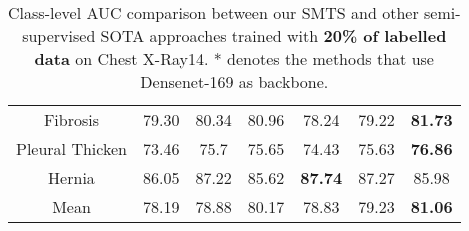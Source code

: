 \documentclass[runningheads]{llncs}
\begin{document}
\begin{table}[t!]
{\begin{tabular}{@{}c|c|c|c|c|c|c@{}}
Fibrosis        &      79.30                              & 80.34            &     80.96           & 78.24       & 79.22           &        \textbf{ 81.73 }   \\
Pleural Thicken &       73.46                             & 75.7             &      75.65          & 74.43       & 75.63           &       \textbf{  76.86 }   \\
Hernia          &      86.05                             & 87.22            &       85.62         & \textbf{87.74 }      & 87.27           &        85.98     \\ \hline 
Mean            &     78.19                               & 78.88            &       80.17         & 78.83       & 79.23           &        \textbf{81.06}     \\ \hline \bottomrule
\end{tabular}}
\caption{Class-level AUC comparison between our SMTS and other semi-supervised SOTA approaches trained with \textbf{20\% of labelled data} on Chest X-Ray14. * denotes the methods that use Densenet-169 as backbone.} \vspace{-.2in}
\label{tab:semi-results}
\end{table}
\end{document}
